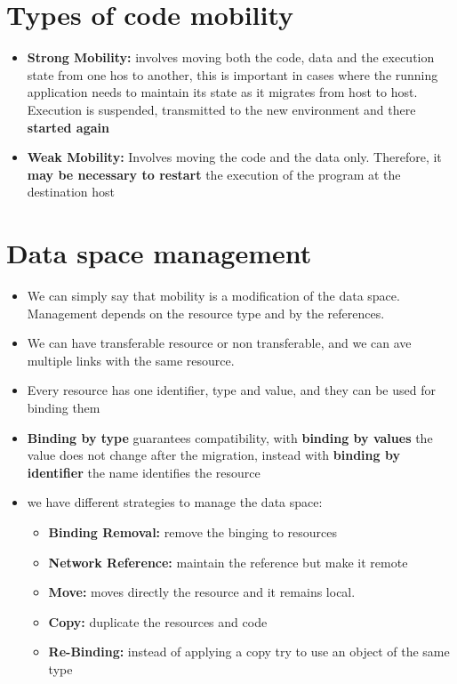 \section{Types of code mobility}
\begin{itemize}
    \item \textbf{Strong Mobility:} involves moving both the code, data and the execution state from one hos to another, this is important in cases where the running application needs to maintain its state as it migrates from host to host. Execution is suspended, transmitted to the new environment and there \textbf{started again}
    \item \textbf{Weak Mobility:} Involves moving the code and the data only. Therefore, it \textbf{may be necessary to restart} the execution of the program at the destination host
\end{itemize}

\section{Data space management}
\begin{itemize}
    \item We can simply say that mobility is a modification of the data space. Management depends on the resource type and by the references.
    \item We can have transferable resource or non transferable, and we can ave multiple links with the same resource.
    \item Every resource has one identifier, type and value, and they can be used for binding them
    \item \textbf{Binding by type} guarantees compatibility, with \textbf{binding by values} the value does not change after the migration, instead with \textbf{binding by identifier} the name identifies the resource
    \item we have different strategies to manage the data space:
    \begin{itemize}
        \item \textbf{Binding Removal:} remove the binging to resources
        \item \textbf{Network Reference:} maintain the reference but make it remote
        \item \textbf{Move:} moves directly the resource and it remains local.
        \item \textbf{Copy:} duplicate the resources and code
        \item \textbf{Re-Binding:} instead of applying a copy try to use an object of the same type
    \end{itemize}
\end{itemize}

